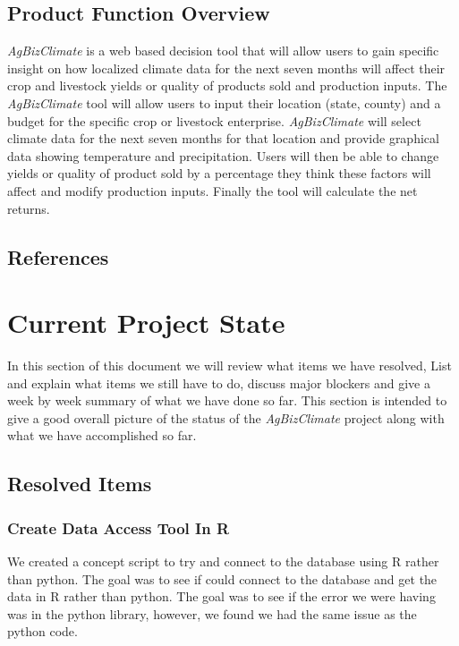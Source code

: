 \documentclass[onecolumn, draftclsnofoot,10pt, compsoc]{article}
\begin{document}
		\subsection{Product Function Overview}
		    \textit{AgBizClimate} is a web based decision tool that will allow users to gain specific insight on how localized climate data for the next seven months will affect their crop and livestock yields or quality of products sold and production inputs. The \textit{AgBizClimate} tool will allow users to input their location (state, county) and a budget for the specific crop or livestock enterprise. \textit{AgBizClimate} will select climate data for the next seven months for that location and provide graphical data showing temperature and precipitation. Users will then be able to change yields or quality of product sold by a percentage they think these factors will affect and modify production inputs. Finally the tool will calculate the net returns.\\



		\renewcommand\refname{\vskip -1cm}
		\subsection{References}

		    \nocite{*}
            
            


\section{Current Project State}
    In this section of this document we will review what items we have resolved, List and explain what items we still have to do, discuss major blockers and give a week by week summary of what we have done so far. This section is intended to give a good overall picture of the status of the \textit{AgBizClimate} project along with what we have accomplished so far.\\

	\subsection{Resolved Items}
		\subsubsection{Create Data Access Tool In R} We created a concept script to try and connect to the database using R rather than python. The goal was to see if could connect to the database and get the data in R rather than python. The goal was to see if the error we were having was in the python library, however, we found we had the same issue as the python code.\\
		
\end{document}
